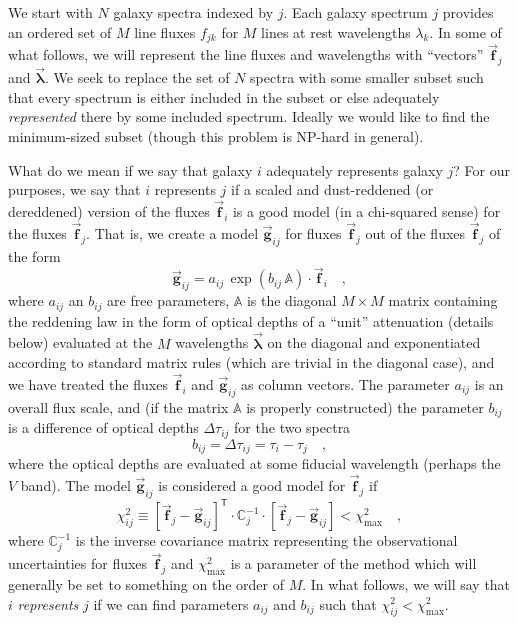 \documentclass[12pt,letterpaper]{article}
\newcommand{\aij}{a_{ij}}
\newcommand{\bij}{b_{ij}}
\newcommand{\chisqij}{\chi^2_{ij}}
\newcommand{\chisqmax}{\chi^2_{\mathrm{max}}}
\newcommand{\datavec}[1]{\vec{\boldsymbol{#1}}}
\newcommand{\vlambda}{\datavec{\lambda}}
\newcommand{\vfi}{\datavec{f}_{\!i}}
\newcommand{\vfj}{\datavec{f}_{\!j}}
\newcommand{\vfmodelij}{\datavec{g}_{ij}}
\newcommand{\datamatrix}[1]{\mathbb{#1}}
\newcommand{\reddening}{\datamatrix{A}}
\newcommand{\invcovarj}{\datamatrix{C}^{-1}_{j}}
\newcommand{\transpose}{^{\!\textsf{T}}}
\begin{document}
We start with $N$ galaxy spectra indexed by $j$.  Each galaxy spectrum
$j$ provides an ordered set of $M$ line fluxes $f_{jk}$ for $M$ lines
at rest wavelengths $\lambda_k$.  In some of what follows, we will
represent the line fluxes and wavelengths with ``vectors'' $\vfj$ and
$\vlambda$.  We seek to replace the set of $N$ spectra with some
smaller subset such that every spectrum is either included in the
subset or else adequately \emph{represented} there by some included
spectrum.  Ideally we would like to find the minimum-sized subset
(though this problem is NP-hard in general).

What do we mean if we say that galaxy $i$ adequately represents galaxy
$j$?  For our purposes, we say that $i$ represents $j$ if a scaled and
dust-reddened (or dereddened) version of the fluxes $\vfi$ is a good
model (in a chi-squared sense) for the fluxes $\vfj$.  That is, we
create a model $\vfmodelij$ for fluxes $\vfj$ out of the fluxes $\vfj$
of the form
\begin{equation}
\vfmodelij= \aij\,\exp\left(\bij\,\reddening\right)\cdot\vfi
\quad,
\end{equation}
where $\aij$ an $\bij$ are free parameters, $\reddening$ is the
diagonal $M\times M$ matrix containing the reddening law in the form
of optical depths of a ``unit'' attenuation (details below) evaluated
at the $M$ wavelengths $\vlambda$ on the diagonal and exponentiated
according to standard matrix rules (which are trivial in the diagonal
case), and we have treated the fluxes $\vfi$ and $\vfmodelij$ as
column vectors.  The parameter $\aij$ is an overall flux scale, and
(if the matrix $\reddening$ is properly constructed) the parameter
$\bij$ is a difference of optical depths $\Delta\tau_{ij}$ for the two
spectra
\begin{equation}
\bij = \Delta\tau_{ij} = \tau_{i}-\tau_{j} \quad,
\end{equation}
where the optical depths are evaluated at some fiducial wavelength
(perhaps the $V$ band).  The model $\vfmodelij$ is considered a good
model for $\vfj$ if
\begin{equation}
\chisqij\equiv \left[\vfj-\vfmodelij\right]\transpose
  \cdot\invcovarj
  \cdot\left[\vfj-\vfmodelij\right] < \chisqmax
\quad,
\end{equation}
where $\invcovarj$ is the inverse covariance matrix representing the
observational uncertainties for fluxes $\vfj$ and $\chisqmax$ is a
parameter of the method which will generally be set to something on
the order of $M$.  In what follows, we will say that $i$
\emph{represents} $j$ if we can find parameters $\aij$ and $\bij$ such
that $\chisqij < \chisqmax$.
\end{document}
